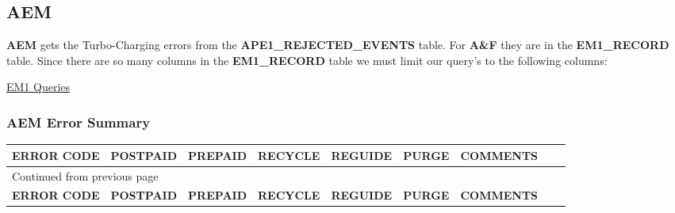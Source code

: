 \documentclass[12pt,twoside]{article}
\begin{document}
\newpage 
\begin{landscape}  
\subsection{AEM}
\label{sec:orgheadline7}
\textbf{AEM} gets the Turbo-Charging errors from the
\textbf{APE1\_REJECTED\_EVENTS} table. For \textbf{A\&F} they are in the
\textbf{EM1\_RECORD} table. Since there are so many columns in the
\textbf{EM1\_RECORD} table we must limit our query's to the following
columns:

\href{docs/EM1\%20Query's}{EM1 Queries}

\subsubsection{AEM Error Summary}
\label{sec:orgheadline6}
\scriptsize
\begin{longtable}{l|l|l|l|l|l|l|l|l}
\hline
\textbf{ERROR CODE} & \textbf{POSTPAID} & \textbf{PREPAID} & \textbf{RECYCLE} & \textbf{REGUIDE} & \textbf{PURGE} & \textbf{COMMENTS}\\
\hline
\endfirsthead
\multicolumn{7}{l}{Continued from previous page} \\
\hline

\textbf{ERROR CODE} & \textbf{POSTPAID} & \textbf{PREPAID} & \textbf{RECYCLE} & \textbf{REGUIDE} & \textbf{PURGE} & \textbf{COMMENTS} \\


\end{longtable}
\end{landscape}
\end{document}
